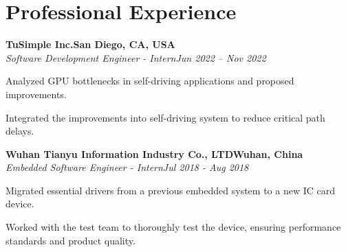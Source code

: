 \documentclass[letterpaper,10pt]{article}
\newcommand{\heading}[2]{
  \hspace{10pt}#1\hfill#2\\
}
\newcommand{\headingBf}[2]{
  \heading{\textbf{#1}}{\textbf{#2}}
}
\newcommand{\headingIt}[2]{
  \heading{\textit{#1}}{\textit{#2}}
}
\newenvironment{resume_list}{
  \vspace{-7pt}
  \begin{itemize}[itemsep=-2px, parsep=1pt, leftmargin=30pt]
}{
  \end{itemize}
}
\begin{document}

  \section{Professional Experience}

  \headingBf{TuSimple Inc.}{San Diego, CA, USA} %
  \headingIt{Software Development Engineer - Intern}{Jun 2022 -- Nov 2022}
    \begin{resume_list}
        \item Analyzed GPU bottlenecks in self-driving applications and proposed improvements.
        \item Integrated the improvements into self-driving system to reduce critical path delays.
    \end{resume_list}

  \headingBf{Wuhan Tianyu Information Industry Co., LTD}{Wuhan, China}
  \headingIt{Embedded Software Engineer - Intern}{Jul 2018 - Aug 2018}
  \begin{resume_list}
      \item Migrated essential drivers from a previous embedded system to a new IC card device.
      \item Worked with the test team to thoroughly test the device, ensuring performance standards and product quality.
  \end{resume_list}
\end{document}
